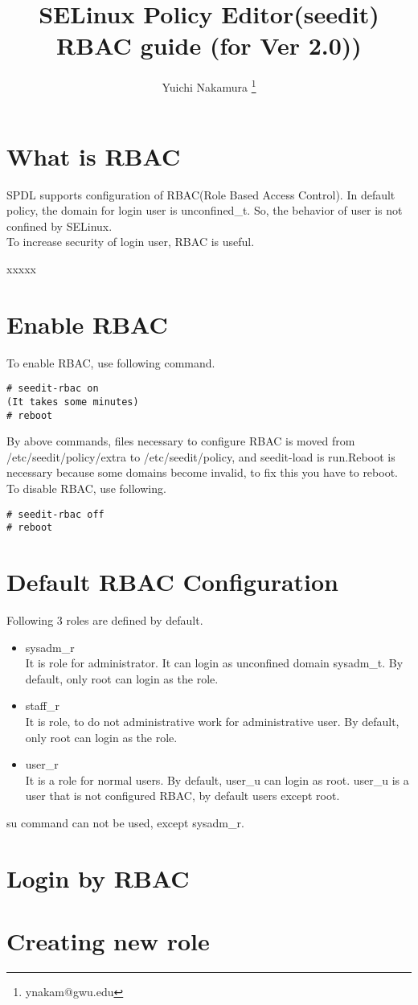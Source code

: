 \documentclass{article}
\title{SELinux Policy Editor(seedit) RBAC guide (for Ver 2.0))}
\author{Yuichi Nakamura \thanks{ynakam@gwu.edu}}
\begin{document}
\def\labelenumi{(\theenumi)}
\maketitle
\tableofcontents
\newpage


\section{What is RBAC}
SPDL supports configuration of RBAC(Role Based Access Control).
In default policy, the domain for login user is unconfined\_t.
So, the behavior of user is not confined by SELinux.\\

To increase security of login user, RBAC is useful.

xxxxx

\section{Enable RBAC}
To enable RBAC, use following command.
\begin{verbatim}
# seedit-rbac on
(It takes some minutes)
# reboot
\end{verbatim}
By above commands, files necessary to configure RBAC is moved from
/etc/seedit/policy/extra to /etc/seedit/policy, and seedit-load is
run.Reboot is necessary because some domains become invalid, to fix this
you have to reboot.\\

To disable RBAC, use following.
\begin{verbatim}
# seedit-rbac off
# reboot
\end{verbatim}

\section{Default RBAC Configuration}
Following 3 roles are defined by default.

\begin{itemize}
 \item sysadm\_r\\
       It is role for administrator. It can login as unconfined
       domain sysadm\_t. By default, only root can login as the role.
 \item staff\_r \\
       It is role, to do not administrative work for administrative
       user.
       By default, only root can login as the role.
 \item user\_r \\
       It is a role for normal users. By default, user\_u can login as
       root.
       user\_u is a user that is not configured RBAC, by default users
       except root.
       
\end{itemize}

su command can not be used, except sysadm\_r.

\section{Login by RBAC}



\section{Creating new role}
\end{document}

